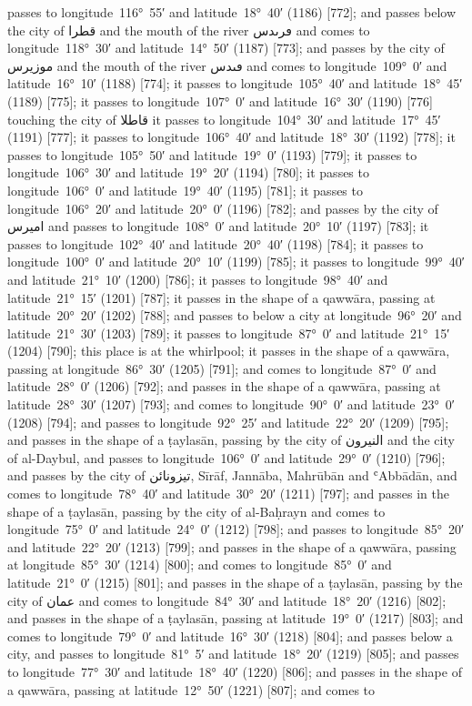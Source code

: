 \documentclass[11pt]{article}
\newcommand{\Pg}[1]{\marginpar{\footnotesize #1}}
\begin{document}
passes to longitude~116°~55′ and latitude~18°~40′ (1186) [772]; and passes below the city of \textarabic{قطرا} and the mouth of the river \textarabic{ڡرٮدس} and comes to longitude~118°~30′ and latitude~14°~50′ (1187) [773]; and passes by the city of \textarabic{موزيرس} and the mouth of the river \textarabic{ڡٮدس} and comes to longitude~109°~0′ and latitude~16°~10′ (1188) [774]; it passes to longitude~105°~40′ and latitude~18°~45′ (1189) [775]; it passes to longitude~107°~0′ and latitude~16°~30′ (1190) [776] touching the city of \textarabic{قاطلا} it passes to longitude~104°~30′ and latitude~17°~45′ (1191) [777]; it passes to longitude~106°~40′ and latitude~18°~30′ (1192) [778]; it passes to longitude~105°~50′ and latitude~19°~0′ (1193) [779]; it passes to longitude~106°~30′ and latitude~19°~20′ (1194) [780]; it passes to longitude~106°~0′ and latitude~19°~40′ (1195) [781]; it passes to longitude~106°~20′ and latitude~20°~0′ (1196) [782]; and passes by the city of \textarabic{اميرس} and passes to longitude~108°~0′ and latitude~20°~10′ (1197) [783]; it passes to longitude~102°~40′ and latitude~20°~40′ (1198) [784]; it passes to longitude~100°~0′ and latitude~20°~10′ (1199) [785]; it passes to longitude~99°~40′ and latitude~21°~10′ (1200) [786]; it passes to longitude~98°~40′ and latitude~21°~15′ (1201) [787]; it passes in the shape of a qawwāra, passing at latitude~20°~20′ (1202) [788]; and passes to below a city at longitude~96°~20′ and latitude~21°~30′ (1203) [789]; it passes to longitude~87°~0′ and latitude~21°~15′ (1204) [790]; this place is at the whirlpool; it passes in the shape of a qawwāra, passing at longitude~86°~30′ (1205) [791]; and comes to longitude~87°~0′ and latitude~28°~0′ (1206) [792]; and passes in the shape of a qawwāra, passing at latitude~28°~30′ (1207) [793]\Pg{p. 79}; and comes to longitude~90°~0′ and latitude~23°~0′ (1208) [794]; and passes to longitude~92°~25′ and latitude~22°~20′ (1209) [795]; and passes in the shape of a ṭaylasān, passing by the city of \textarabic{النيرون} and the city of al-Daybul, and passes to longitude~106°~0′ and latitude~29°~0′ (1210) [796]; and passes by the city of \textarabic{تيزونائن}, Sīrāf, Jannāba, Mahrūbān and ʿAbbādān, and comes to longitude~78°~40′ and latitude~30°~20′ (1211) [797]; and passes in the shape of a ṭaylasān, passing by the city of al-Baḥrayn and comes to longitude~75°~0′ and latitude~24°~0′ (1212) [798]; and passes to longitude~85°~20′ and latitude~22°~20′ (1213) [799]; and passes in the shape of a qawwāra, passing at longitude~85°~30′ (1214) [800]; and comes to longitude~85°~0′ and latitude~21°~0′ (1215) [801]; and passes in the shape of a ṭaylasān, passing by the city of \textarabic{عمان} and comes to longitude~84°~30′ and latitude~18°~20′ (1216) [802]; and passes in the shape of a ṭaylasān, passing at latitude~19°~0′ (1217) [803]; and comes to longitude~79°~0′ and latitude~16°~30′ (1218) [804]; and passes below a city, and passes to longitude~81°~5′ and latitude~18°~20′ (1219) [805]; and passes to longitude~77°~30′ and latitude~18°~40′ (1220) [806]; and passes in the shape of a qawwāra, passing at latitude~12°~50′ (1221) [807]; and comes to 
\end{document}
